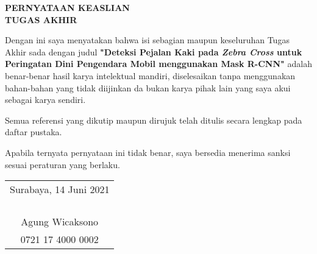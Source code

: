 \begin{center}
  \large
  \textbf{PERNYATAAN KEASLIAN\\TUGAS AKHIR}
\end{center}

\thispagestyle{empty}

\vspace{2ex}


Dengan ini saya menyatakan bahwa isi sebagian maupun keseluruhan Tugas Akhir sada dengan judul \textbf{"Deteksi Pejalan Kaki pada \textit{Zebra Cross} untuk Peringatan Dini Pengendara Mobil menggunakan Mask R-CNN"} adalah benar-benar hasil karya intelektual mandiri, diselesaikan tanpa menggunakan bahan-bahan yang tidak diijinkan da bukan karya pihak lain yang saya akui sebagai karya sendiri.

Semua referensi yang dikutip maupun dirujuk telah ditulis secara lengkap pada daftar pustaka.

Apabila ternyata pernyataan ini tidak benar, saya bersedia menerima sanksi sesuai peraturan yang berlaku.

\vspace{4ex}

\begin{flushright}
  \begin{tabular}[b]{c}
    Surabaya, 14 Juni 2021\\
    \\
    \\
    \\
    \\
    Agung Wicaksono\\
    0721 17 4000 0002
  \end{tabular}
\end{flushright}
